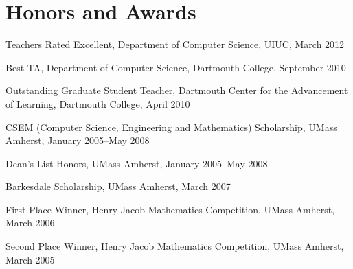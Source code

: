 \section{\sc Honors and Awards}
Teachers Rated Excellent, Department of Computer Science, UIUC, March 2012
\vspace*{-2.5mm}

Best TA, Department of Computer Science, Dartmouth College, September 2010
\vspace*{-2.5mm}

Outstanding Graduate Student Teacher, Dartmouth
Center for the Advancement of Learning, Dartmouth College, April 2010
\vspace*{-2.5mm}

CSEM (Computer Science, Engineering and Mathematics) Scholarship,
UMass Amherst, January 2005--May 2008
\vspace*{-2.5mm}

Dean's List Honors, UMass Amherst, January 2005--May 2008
\vspace*{-2.5mm}

Barkesdale Scholarship, UMass Amherst, March 2007
\vspace*{-2.5mm}

First Place Winner, Henry Jacob Mathematics
Competition, UMass Amherst, March 2006
\vspace*{-2.5mm}

Second Place Winner, Henry Jacob Mathematics
Competition, UMass Amherst, March 2005
\vspace*{-2.5mm}

